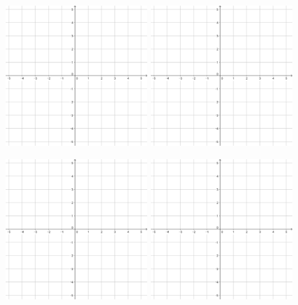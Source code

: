 \documentclass[a4paper]{oblivoir}
\begin{document}
\clearpage
\begin{figure}
\noindent\includegraphics[width=0.47\textwidth]{55}
\hspace{30pt}\includegraphics[width=0.47\textwidth]{55}
\par\vspace{40pt}
\noindent\includegraphics[width=0.47\textwidth]{55}
\hspace{30pt}\includegraphics[width=0.47\textwidth]{55}
\end{figure}
\end{document}
